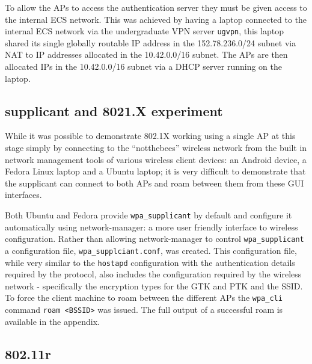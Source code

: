 \documentclass[pdftex, 12pt, a4paper]{article}
\begin{document}
To allow the APs to access the authentication server they must be given access to the internal ECS network.  This was achieved by having a laptop connected to the internal ECS network via the undergraduate VPN server \verb`ugvpn`, this laptop shared its single globally routable IP address in the 152.78.236.0/24 subnet via NAT to IP addresses allocated in the 10.42.0.0/16 subnet.  The APs are then allocated IPs in the 10.42.0.0/16 subnet via a DHCP server running on the laptop.



\subsection{supplicant and 8021.X experiment}
While it was possible to demonstrate 802.1X working using a single AP at this stage simply by connecting to the ``notthebees'' wireless network from the built in network management tools of various wireless client devices: an Android device, a Fedora Linux laptop and a Ubuntu laptop; it is very difficult to demonstrate that the supplicant can connect to both APs and roam between them from these GUI interfaces.

Both Ubuntu and Fedora provide \verb`wpa_supplicant` by default and configure it automatically using network-manager: a more user friendly interface to wireless configuration.  Rather than allowing network-manager to control \verb`wpa_supplicant` a configuration file, \verb`wpa_supplciant.conf`, was created. This configuration file, while very similar to the \verb`hostapd` configuration with the authentication details required by the protocol, also includes the configuration required by the wireless network - specifically the encryption types for the GTK and PTK and the SSID.  To force the client machine to roam between the different APs the \verb`wpa_cli` command \verb`roam <BSSID>` was issued.  The full output of a successful roam is available in the appendix.


\subsection{802.11r}
\end{document}
